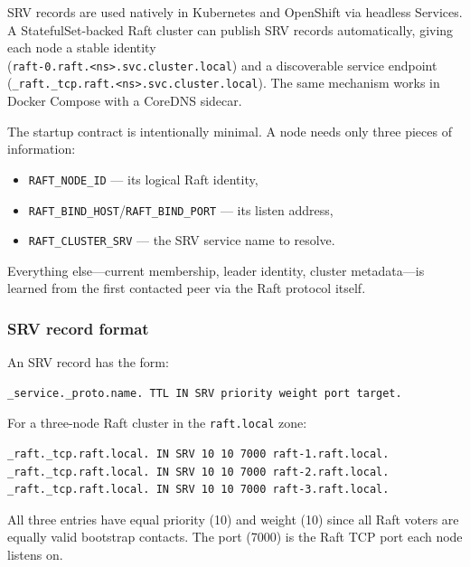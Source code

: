 SRV records are used natively in Kubernetes and OpenShift via headless
Services. A StatefulSet-backed Raft cluster can publish SRV records
automatically, giving each node a stable identity \\
(\texttt{raft-0.raft.\textless ns\textgreater .svc.cluster.local}) and a
discoverable service endpoint \\ 
(\texttt{\_raft.\_tcp.raft.\textless ns\textgreater .svc.cluster.local}). The same mechanism works in Docker
Compose with a CoreDNS sidecar.

The startup contract is intentionally minimal. A node needs only three
pieces of information:

\begin{itemize}
\item \texttt{RAFT\_NODE\_ID} --- its logical Raft identity,
\item \texttt{RAFT\_BIND\_HOST}/\texttt{RAFT\_BIND\_PORT} --- its listen address,
\item \texttt{RAFT\_CLUSTER\_SRV} --- the SRV service name to resolve.
\end{itemize}

Everything else---current membership, leader identity, cluster metadata---is
learned from the first contacted peer via the Raft protocol itself.

\subsubsection{SRV record format}

An SRV record has the form:

\begin{lstlisting}[caption={SRV record format}]
_service._proto.name. TTL IN SRV priority weight port target.
\end{lstlisting}

For a three-node Raft cluster in the \texttt{raft.local} zone:

\begin{lstlisting}[caption={Example SRV zone entries}]
_raft._tcp.raft.local. IN SRV 10 10 7000 raft-1.raft.local.
_raft._tcp.raft.local. IN SRV 10 10 7000 raft-2.raft.local.
_raft._tcp.raft.local. IN SRV 10 10 7000 raft-3.raft.local.
\end{lstlisting}

All three entries have equal priority (10) and weight (10) since all Raft
voters are equally valid bootstrap contacts. The port (7000) is the Raft
TCP port each node listens on.

